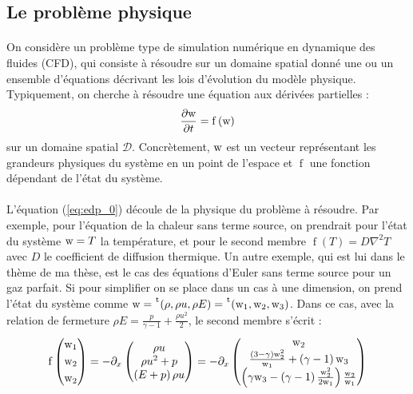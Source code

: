 	\subsection{Le problème physique}

		\paragraph{}
		On considère un problème type de simulation numérique en dynamique des fluides (CFD), qui consiste à résoudre sur un domaine spatial donné une ou un ensemble d'équations décrivant les lois d'évolution du modèle physique.
		Typiquement, on cherche à résoudre une équation aux dérivées partielles :
		\begin{equation}\label{eq:edp_0}
			\frac{\partial\textup{w}}{\partial t} = \operatorname{f}\left(\textup{w}\right)
		\end{equation}
		sur un domaine spatial $\mathcal{D}$.
		Concrètement, $\textup{w}$ est un vecteur représentant les grandeurs physiques du système en un point de l'espace et $\operatorname{f}$ une fonction dépendant de l'état du système.

		\paragraph{}
		L'équation (\ref{eq:edp_0}) découle de la physique du problème à résoudre.
		Par exemple, pour l'équation de la chaleur sans terme source, on prendrait pour l'état du système $\textup{w} = T$ la température, et pour le second membre $\operatorname{f}\left(T\right) = D\nabla^2T$ avec $D$ le coefficient de diffusion thermique.
		Un autre exemple, qui est lui dans le thème de ma thèse, est le cas des équations d'Euler sans terme source pour un gaz parfait.
		Si pour simplifier on se place dans un cas à une dimension, on prend l'état du système comme $\textup{w} = \mskip1mu\prescript{\smash{\mathrm t\mkern-3mu}}{}{\mathstrut\left(\rho, \rho u, \rho E\right)} = \mskip1mu\prescript{\smash{\mathrm t\mkern-3mu}}{}{\mathstrut\left(\textup{w}_1, \textup{w}_2, \textup{w}_3\right)}$.
		Dans ce cas, avec la relation de fermeture $\rho E = \frac{p}{\gamma - 1} + \frac{\rho u^2}{2}$, le second membre s'écrit :
		$$\operatorname{f}\left(\begin{aligned}\textup{w}_1\\\textup{w}_2\\\textup{w}_2\end{aligned}\right)
			= -\partial_x\begin{pmatrix}
				\rho u\\
				\rho u^2 + p\\
				\left(E + p\right)\rho u
				\end{pmatrix}
			= -\partial_x\begin{pmatrix}
				\textup{w}_2\\
				\frac{\left(3 - \gamma\right)\textup{w}_2^2}{\textup{w}_1} + \left(\gamma - 1\right)\textup{w}_3\\
				\left(\gamma\textup{w}_3 - \left(\gamma - 1\right)\frac{\textup{w}_2^2}{2\textup{w}_1}\right)\frac{\textup{w}_2}{\textup{w}_1}
			\end{pmatrix}
		$$

